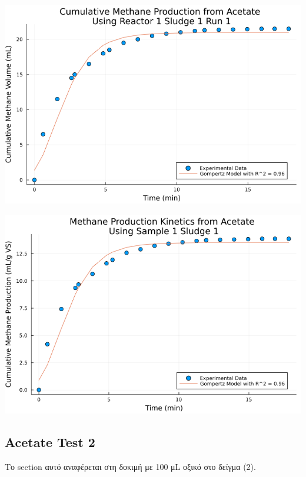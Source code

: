\documentclass[11pt]{article}
\begin{document}
\begin{center}
\includegraphics[width=.9\linewidth]{../plots/BMPs/Acetate/methane_kinetics_acet_test_1_s1_min.png}
\end{center}

\begin{center}
\includegraphics[width=.9\linewidth]{../plots/BMPs/Acetate/specific_methane_kinetics_acet_test_1_s1.png}
\end{center}

\subsection{Acetate Test 2}
\label{sec:org3a4980c}
Το section αυτό αναφέρεται στη δοκιμή με 100 μL οξικό στο δείγμα (2).
\end{document}
